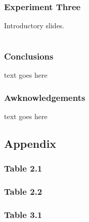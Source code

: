 \documentclass{beamer}
\begin{document}
 \begin{frame}
  \frametitle{Experiment Three}
 Introductory slides. 
 \end{frame}

\section*{}
\begin{frame}
  \frametitle{Conclusions}
  text goes here
 \end{frame}

 \begin{frame}
  \frametitle{Awknowledgements}
  text goes here
 \end{frame}


\subsection*{Appendix}
\begin{frame}
  \frametitle{Table 2.1}
 \end{frame}

\begin{frame}
  \frametitle{Table 2.2}
  
 \end{frame}

\begin{frame}
  \frametitle{Table 3.1}
  \tiny
  \centering
  \setlength{\tabcolsep}{5pt}
  
 \end{frame}


 
\end{document}
